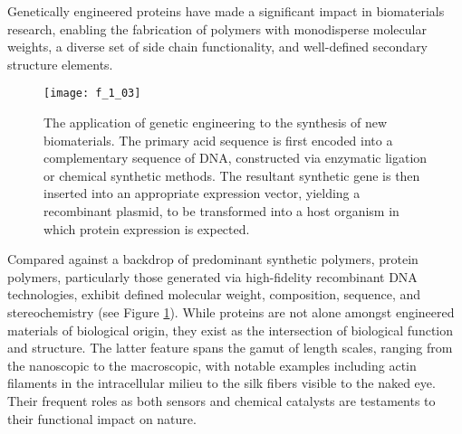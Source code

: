 \begin{refsection}
Genetically engineered proteins have made a significant impact in biomaterials
research, enabling the fabrication of polymers with monodisperse molecular
weights, a diverse set of side chain functionality, and well-defined secondary
structure elements.\cite{
Yoshikawa1994,Wang2001,Rabotyagova2009,Martin2009,Dinerman2002,Megeed2002,Haider2004,Wright2002,Banta2010,Link2003,Straley2009,Rabotyagova2011}
\begin{figure}[h!] \centering \texttt{[image: f\_1\_03]}
    \caption[The application of genetic engineering to the synthesis of new
            biomaterials. The primary acid sequence is first encoded into a
            complementary sequence of DNA, constructed via enzymatic ligation or
            chemical synthetic methods. The resultant synthetic gene is then
            inserted into an appropriate expression vector, yielding a
            recombinant plasmid, to be transformed into a host organism in which
            protein expression is
            expected.]
        {The application of genetic engineering to the synthesis of new
            biomaterials. The primary acid sequence is first encoded into a
            complementary sequence of DNA, constructed via enzymatic ligation or
            chemical synthetic methods. The resultant synthetic gene is then
            inserted into an appropriate expression vector, yielding a
            recombinant plasmid, to be transformed into a host organism in which
            protein expression is
            expected.\cite{Tirrell1991}}\label{fig:protein_engineering_methods}
        \end{figure}
Compared against a backdrop of predominant synthetic polymers, protein polymers,
particularly those generated via high-fidelity recombinant DNA technologies,
exhibit defined molecular weight, composition, sequence, and stereochemistry
(see Figure \ref{fig:protein_engineering_methods}).\cite{VanHest2001} While
proteins are not alone amongst engineered materials of biological origin, they
exist as the intersection of biological function and structure. The latter
feature spans the gamut of length scales, ranging from the nanoscopic to the
macroscopic, with notable examples including actin filaments in the
intracellular milieu to the silk fibers visible to the naked
eye.\cite{Rabotyagova2009,Megeed2002,Nagarsekar2002} Their frequent roles as
both sensors and chemical catalysts are testaments to their functional impact on
nature.


\end{refsection}
